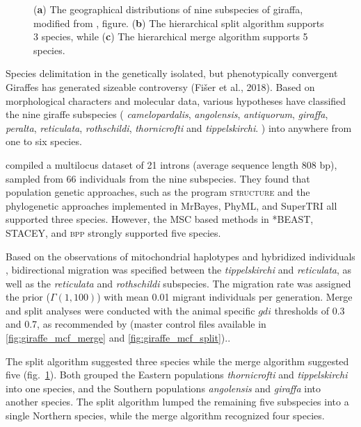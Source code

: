 \documentclass[A4]{article1}
\begin{document}
\begin{figure}[t]
    \caption{(\textbf{a}) The geographical distributions of nine subspecies of
   giraffa, modified from \citet{Petzold2020}, figure.  (\textbf{b}) The hierarchical
   split algorithm supports 3 species, while (\textbf{c}) The hierarchical merge
   algorithm supports 5 species.
} \label{fig:giraffe}
\end{figure}

Species delimitation in the genetically isolated, but
phenotypically convergent Giraffes has generated
sizeable controversy (Fišer et al., 2018). Based
on morphological characters and molecular data,
various hypotheses have classified the nine giraffe
subspecies ( \textit{camelopardalis},
\textit{angolensis}, \textit{antiquorum}, \textit{giraffa}, \textit{peralta},
\textit{reticulata}, \textit{rothschildi}, \textit{thornicrofti} and
\textit{tippelskirchi}. ) into anywhere from one to six species.

\citet{Petzold2020} compiled a multilocus dataset of 21 introns (average sequence length
808 bp), sampled from 66 individuals from the nine subspecies.  They found that
population genetic approaches, such as the program \textsc{structure} and the
phylogenetic approaches implemented in MrBayes, PhyML, and SuperTRI all supported three
species. However, the MSC based methods in *BEAST, STACEY, and \textsc{bpp} strongly
supported five species. 


Based on the observations of mitochondrial haplotypes and
hybridized individuals \citep{Fennessy2016, Petzold2020}, bidirectional migration was
specified between the \textit{tippelskirchi} and \textit{reticulata}, as well as the
\textit{reticulata} and \textit{rothschildi} subspecies.  The migration rate was assigned
the prior ($\Gamma (1,100)$) with mean 0.01 migrant individuals per generation.  Merge and
split analyses were conducted with the animal specific $gdi$ thresholds of 0.3 and 0.7, as
recommended by \citet{Jackson2017} (master control files available in \ref{fig:giraffe_mcf_merge} and \ref{fig:giraffe_mcf_split})..

The split algorithm suggested three species while the merge
algorithm suggested five (fig.~\ref{fig:giraffe}).  Both grouped the Eastern populations
\textit{thornicrofti} and \textit{tippelskirchi} into one species, and the Southern
populations \textit{angolensis} and \textit{giraffa} into another species. The split
algorithm lumped the remaining five subspecies into a single Northern species, while the
merge algorithm recognized four species. 
\end{document}
